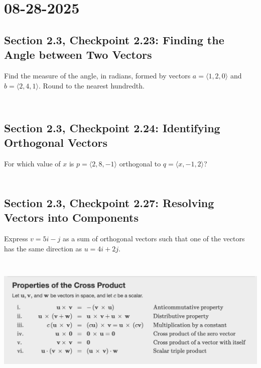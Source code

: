 \documentclass[]{mangos-musings}
\begin{document}
\newpage
\section{08-28-2025}
\subsection{Section 2.3, Checkpoint 2.23: Finding the Angle between Two Vectors}
Find the measure of the angle, in radians, formed by vectors $a=\langle1,2,0\rangle$ and $b=\langle2,4,1\rangle$. Round to the nearest hundredth.
\begin{align*}
  \\ 
  \\ 
  \\ 
  \\
\end{align*}

\subsection{Section 2.3, Checkpoint 2.24: Identifying Orthogonal Vectors}
For which value of $x$ is $p=\langle2,8,-1\rangle$ orthogonal to $q=\langle x,-1,2\rangle$?
\begin{align*}
  \\ 
  \\ 
  \\
\end{align*}

\subsection{Section 2.3, Checkpoint 2.27: Resolving Vectors into Components}
Express $v=5i-j$ as a sum of orthogonal vectors such that one of the vectors has the same direction as $u=4i+2j$.
\begin{align*}
  \\ 
  \\
  \\
  \\
\end{align*}
\begin{center}
  \includegraphics[scale=0.6]{assets/rec02-crossprod-properties.png}
\end{center}
\end{document}
